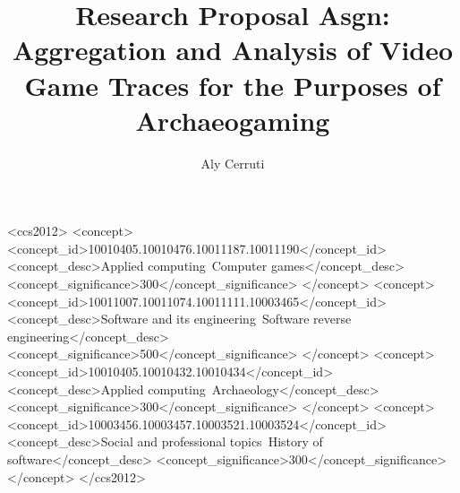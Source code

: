 \documentclass[manuscript,anonymous,review,authorversion=true,nonacm=true,screen]{acmart}
\begin{document}
\title[Aggregation \& Analysis of Video Game Traces]{Research Proposal Asgn: Aggregation and Analysis of Video Game Traces for the Purposes of Archaeogaming}

\author{Aly Cerruti}



\begin{CCSXML}
    <ccs2012>
    <concept>
    <concept_id>10010405.10010476.10011187.10011190</concept_id>
    <concept_desc>Applied computing~Computer games</concept_desc>
    <concept_significance>300</concept_significance>
    </concept>
    <concept>
    <concept_id>10011007.10011074.10011111.10003465</concept_id>
    <concept_desc>Software and its engineering~Software reverse engineering</concept_desc>
    <concept_significance>500</concept_significance>
    </concept>
    <concept>
    <concept_id>10010405.10010432.10010434</concept_id>
    <concept_desc>Applied computing~Archaeology</concept_desc>
    <concept_significance>300</concept_significance>
    </concept>
    <concept>
    <concept_id>10003456.10003457.10003521.10003524</concept_id>
    <concept_desc>Social and professional topics~History of software</concept_desc>
    <concept_significance>300</concept_significance>
    </concept>
    </ccs2012>
\end{CCSXML}
\end{document}
